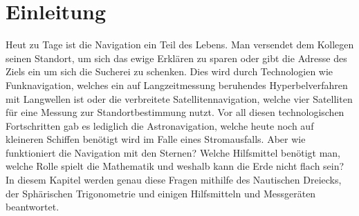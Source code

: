\documentclass[12pt]{scrartcl}
\begin{document}
\section{Einleitung}
Heut zu Tage ist die Navigation ein Teil des Lebens. 
Man versendet dem Kollegen seinen Standort, um sich das ewige Erklären zu sparen oder gibt die Adresse des Ziels ein um sich die Sucherei zu schenken. 
Dies wird durch Technologien wie Funknavigation, welches ein auf Langzeitmessung beruhendes Hyperbelverfahren mit Langwellen ist oder die verbreitete Satellitennavigation, welche vier Satelliten für eine Messung zur Standortbestimmung nutzt.
Vor all diesen technologischen Fortschritten gab es lediglich die Astronavigation, welche heute noch auf kleineren Schiffen benötigt wird im Falle eines Stromausfalls. 
Aber wie funktioniert die Navigation mit den Sternen? Welche Hilfsmittel benötigt man, welche Rolle spielt die Mathematik und weshalb kann die Erde nicht flach sein? 
In diesem Kapitel werden genau diese Fragen mithilfe des Nautischen Dreiecks, der Sphärischen Trigonometrie und einigen Hilfsmitteln und Messgeräten beantwortet. 
	
	
\end{document}
